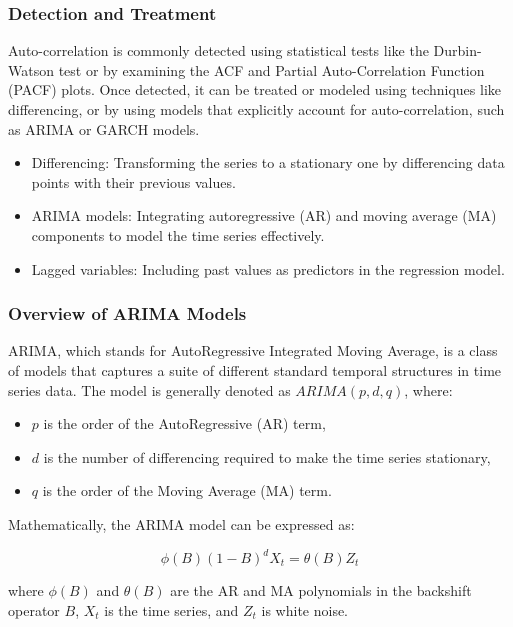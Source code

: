 \documentclass[12pt, twoside,hidelinks]{article}
\theoremstyle{definition}
\numberwithin{equation}{section}
\begin{document}
\subsubsection*{Detection and Treatment}

Auto-correlation is commonly detected using statistical tests like the Durbin-Watson test or by examining the ACF and Partial Auto-Correlation Function (PACF) plots. Once detected, it can be treated or modeled using techniques like differencing, or by using models that explicitly account for auto-correlation, such as ARIMA or GARCH models.


\begin{itemize}
  \item Differencing: Transforming the series to a stationary one by differencing data points with their previous values.
  \item ARIMA models: Integrating autoregressive (AR) and moving average (MA) components to model the time series effectively.
  \item Lagged variables: Including past values as predictors in the regression model.
\end{itemize}




\subsubsection*{Overview of ARIMA Models}

ARIMA, which stands for AutoRegressive Integrated Moving Average, is a class of models that captures a suite of different standard temporal structures in time series data. The model is generally denoted as \(ARIMA(p, d, q)\), where:

\begin{itemize}
    \item \(p\) is the order of the AutoRegressive (AR) term,
    \item \(d\) is the number of differencing required to make the time series stationary,
    \item \(q\) is the order of the Moving Average (MA) term.
\end{itemize}

Mathematically, the ARIMA model can be expressed as:

\[
\phi(B)(1-B)^d X_t = \theta(B)Z_t
\]

where \( \phi(B) \) and \( \theta(B) \) are the AR and MA polynomials in the backshift operator \( B \), \( X_t \) is the time series, and \( Z_t \) is white noise.
\end{document}

